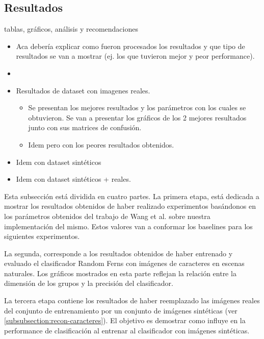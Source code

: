 \newpage
\subsection{Resultados}

\label{subsection:resultados}
	tablas, gráficos, análisis y recomendaciones
	\begin{itemize}
		\item Aca debería explicar como fueron procesados los
                  resultados y que tipo de resultados se van a mostrar (ej. los
                  que tuvieron mejor y peor performance). 
                \item {}
		\item Resultados de dataset con imagenes reales.
		\begin{itemize}
			\item Se presentan los mejores resultados y los parámetros con los cuales se obtuvieron. Se van a presentar los gráficos de los 2 mejores resultados junto con sus matrices de confusión.
			\item Idem pero con los peores resultados obtenidos.
		\end{itemize}
		\item Idem con dataset sintéticos
		\item Idem con dataset sintéticos + reales.

	\end{itemize}
	
		
	Esta subsección está dividida en cuatro partes. La primera etapa, está dedicada a mostrar los resultados obtenidos de haber realizado experimentos basándonos en los parámetros obtenidos del trabajo de Wang et al. sobre nuestra implementación del mismo. Estos valores van a conformar los baselines para los siguientes experimentos. 
	
	La segunda, corresponde a los resultados obtenidos de haber entrenado y evaluado el clasificador Random Ferns con imágenes de caracteres en escenas naturales. Los gráficos mostrados en esta parte reflejan la relación entre la dimensión de los grupos y la precisión del clasificador.
	
	La tercera etapa contiene los resultados de haber reemplazado las imágenes reales del conjunto de entrenamiento por un conjunto de imágenes sintéticas (ver \ref{subsubsection:recon-caracteres}). El objetivo es demostrar como influye en la performance de clasificación al entrenar al clasificador con imágenes sintéticas.
	
